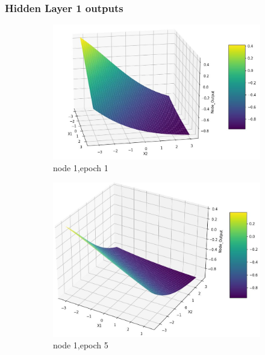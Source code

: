\documentclass[11pt]{article}
\begin{document}
\subsubsection{Hidden Layer 1 outputs}
\begin{figure}[h]
\centering
	\begin{subfigure}[b]{0.18\textwidth}
	\centering
	\includegraphics[scale=0.14]{hidden1_n1_e1.jpg}
	\caption{node 1,epoch 1}
	\label{fig:fig2.1.4.1}
	\end{subfigure}
	\begin{subfigure}[b]{0.18\textwidth}
	\centering
	\includegraphics[scale=0.14]{hidden1_n1_e5.jpg}
	\caption{node 1,epoch 5}
	\label{fig:fig2.1.4.2}
	\end{subfigure}
	\begin{subfigure}[b]{0.18\textwidth}
	\centering

\end{subfigure}
\end{figure}
\end{document}
